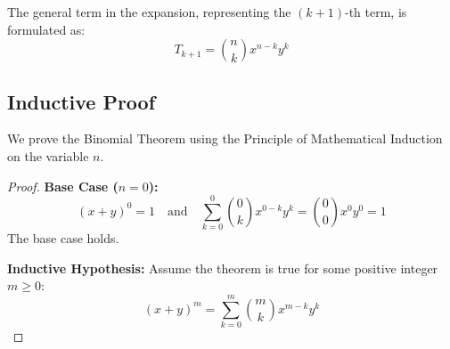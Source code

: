 \documentclass[10pt,journal,compsoc,onecolumn]{IEEEtran}
\begin{document}
The general term in the expansion, representing the $(k+1)$-th term, is formulated as:
\begin{equation}
T_{k+1} = \binom{n}{k} x^{n - k} y^k
\end{equation}

\subsection{Inductive Proof}

We prove the Binomial Theorem using the Principle of Mathematical Induction on the variable $n$.

\begin{proof}
\textbf{Base Case ($n = 0$):}
\begin{equation}
(x + y)^0 = 1 \quad \text{and} \quad \sum_{k=0}^{0} \binom{0}{k} x^{0-k} y^k = \binom{0}{0} x^0 y^0 = 1
\end{equation}
The base case holds.

\textbf{Inductive Hypothesis:}
Assume the theorem is true for some positive integer $m \ge 0$:
\begin{equation}
(x + y)^m = \sum_{k=0}^{m} \binom{m}{k} x^{m - k} y^k
\end{equation}


\end{proof}
\end{document}
